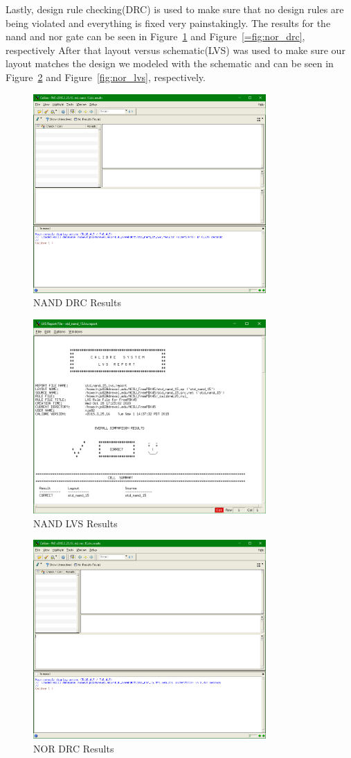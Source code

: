 \documentclass[12pt]{article}
\begin{document}
Lastly, design rule checking(DRC) is used to make sure that no design rules are being violated and everything is fixed very painstakingly. The results for the nand and nor gate can
be seen in Figure~\ref{fig:nand_drc} and Figure~\ref{=fig:nor_drc}, respectively  After that layout versus schematic(LVS) was used to make sure our layout matches
the design we modeled with the schematic and can be seen in Figure~\ref{fig:nand_lvs} and Figure~\ref{fig:nor_lvs}, respectively.
\begin{figure}[!htb]
  \centering
  \includegraphics[width=3.5in]{figures/nand/nand_drc.png}
  \caption{NAND DRC Results}\label{fig:nand_drc}
\end{figure}
\begin{figure}[!htb]
  \centering
  \includegraphics[width=3.5in]{figures/nand/nand_lvs.png}
  \caption{NAND LVS Results}\label{fig:nand_lvs}
\end{figure}
\begin{figure}[!htb]
  \centering
  \includegraphics[width=3.5in]{figures/nor/nor_drc.png}
  \caption{NOR DRC Results}\label{fig:nor_drc}
\end{figure}
\end{document}
